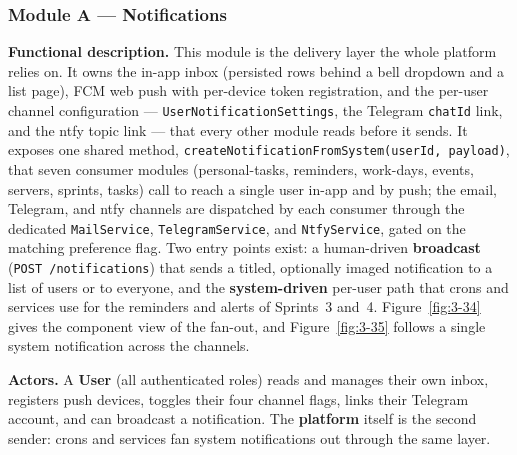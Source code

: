 {\renewcommand{\figmaxheight}{0.75\textheight}%
}

\subsubsection{Module A --- Notifications}

\textbf{Functional description.} This module is the delivery layer the whole platform relies
on. It owns the in-app inbox (persisted rows behind a bell dropdown and a list page), FCM web
push with per-device token registration, and the per-user channel configuration ---
\texttt{UserNotificationSettings}, the Telegram \texttt{chatId} link, and the ntfy topic link
--- that every other module reads before it sends. It exposes one shared method,
\texttt{createNotificationFromSystem(userId, payload)}, that seven consumer modules
(personal-tasks, reminders, work-days, events, servers, sprints, tasks) call to reach a single
user in-app and by push; the email, Telegram, and ntfy channels are dispatched by each
consumer through the dedicated \texttt{MailService}, \texttt{TelegramService}, and
\texttt{NtfyService}, gated on the matching preference flag. Two entry points exist: a
human-driven \textbf{broadcast} (\texttt{POST /notifications}) that sends a titled, optionally
imaged notification to a list of users or to everyone, and the \textbf{system-driven} per-user
path that crons and services use for the reminders and alerts of Sprints~3 and~4.
Figure~\ref{fig:3-34} gives the component view of the fan-out, and Figure~\ref{fig:3-35}
follows a single system notification across the channels.

\textbf{Actors.} A \textbf{User} (all authenticated roles) reads and manages their own inbox,
registers push devices, toggles their four channel flags, links their Telegram account, and
can broadcast a notification. The \textbf{platform} itself is the second sender: crons and
services fan system notifications out through the same layer.


